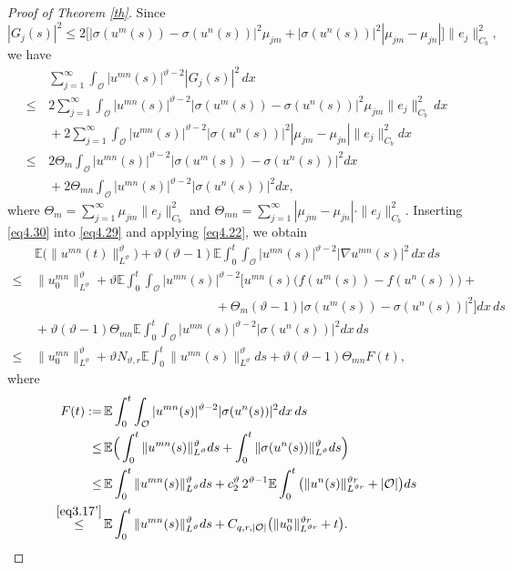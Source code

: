 \documentclass[10pt]{article}
\numberwithin{figure}{section}
\numberwithin{equation}{section}
\newcommand{\0}{{\theta}}
\def\.{\cdot}
\def\Hs{\hspace{1cm}}\def\hs{\hspace{0.5cm}}
\begin{document}
\begin{proof}[Proof of Theorem \ref{th}]
Since 
$$
|G_j(s)|^2\le 2\big[|\sigma(u^m(s))- \sigma(u^n(s))|^2\mu_{jm}+|\sigma(u^n(s))|^2|\mu_{jm}-\mu_{jn}|\big]\|e_j\|_{C_b}^2,
$$
we have
\begin{equation}\label{eq4.30}
\begin{split}
&\,\sum_{j=1}^\infty \int_{\mathcal{O}} |u^{mn}(s)|^{\vartheta-2} |G_j(s)|^2 \, dx \\
\le&\,2\sum_{j=1}^\infty  \int_{\mathcal{O}} |u^{mn}(s)|^{\vartheta-2} |\sigma(u^m(s))- \sigma(u^n(s))|^2\mu_{jm}\|e_j\|_{C_b}^2 \, dx\\
&\,+2\sum_{j=1}^\infty  \int_{\mathcal{O}} |u^{mn}(s)|^{\vartheta-2} |\sigma(u^n(s))|^2|\mu_{jm}-\mu_{jn}|\|e_j\|_{C_b}^2  dx\\
\le&\,2\Theta_m  \int_{\mathcal{O}} |u^{mn}(s)|^{\vartheta-2} |\sigma(u^m(s))- \sigma(u^n(s))|^2dx  \\
&\,+2\Theta_{mn}\int_{\mathcal{O}} |u^{mn}(s)|^{\vartheta-2} |\sigma(u^n(s))|^2 dx,
\end{split}
\end{equation}
where $\Theta_m=\sum_{j=1}^\infty\mu_{jm}\|e_j\|_{C_b}^2$ and $\Theta_{mn}=\sum_{j=1}^\infty|\mu_{jm}-\mu_{jn}|\.\|e_j\|_{C_b}^2$.
\vs
Inserting \eqref{eq4.30} into \eqref{eq4.29} and applying \eqref{eq4.22}, we obtain
\begin{equation}\label{eq4.31}
\begin{split}
&\,\mathbb{E}\big(\|u^{mn}(t)\|_{L^\vartheta}^\vartheta\big) +\vartheta(\vartheta-1) \mathbb{E}\int_0^t \int_{\mathcal{O}} |u^{mn}(s)|^{\vartheta-2} |\nabla u^{mn}(s)|^2 \, dx \, ds\\
\le &\,\|u^{mn}_0\|_{L^\vartheta}^\vartheta
+ \vartheta \mathbb{E}\int_0^t \int_{\mathcal{O}} |u^{mn}(s)|^{\vartheta-2}
        \big[  u^{mn}(s) \big( f(u^m(s)) - f(u^n(s)) \big)+ \\
&\Hs\Hs\Hs\Hs\Hs\Hs + \Theta_m (\vartheta-1) | \sigma(u^m(s)) - \sigma(u^n(s)) |^2 \big] dx \, ds \\
&\, + \vartheta(\vartheta-1)\Theta_{mn} \mathbb{E}\int_0^t\int_{\mathcal{O}} |u^{mn}(s)|^{\vartheta-2} |\sigma(u^n(s))|^2 dx\, ds\\
\le&\,\|u^{mn}_0\|_{L^\vartheta}^\vartheta
+ \vartheta N_{\vartheta,r}\mathbb{E}\int_0^t \|u^{mn}(s)\|_{L^\vartheta}^{\vartheta}ds +\vartheta(\vartheta-1)\Theta_{mn} F(t),
\end{split}
\end{equation}
where 
\begin{align*}
F(t):=&\,\mathbb{E}\int_0^t\int_{\mathcal{O}} |u^{mn}(s)|^{\vartheta-2} |\sigma(u^n(s))|^2 dx\, ds\\
\le&\,\mathbb{E}\Big(\int_0^t\|u^{mn}(s)\|_{L^\vartheta}^\vartheta ds+\int_0^t\|\sigma(u^n(s))\|_{L^\vartheta}^\vartheta ds\Big)\\
\le&\,\mathbb{E}\int_0^t\|u^{mn}(s)\|_{L^\vartheta}^\vartheta ds+c_2^\vartheta \, 2^{\vartheta-1} \mathbb{E}\int_0^t \big( \|u^n(s)\|_{L^{\vartheta r}}^{\vartheta r} + |\mathcal{O}| \big)ds\\
\stackrel{\eqref{eq3.17'}}{\le}&\,\mathbb{E}\int_0^t\|u^{mn}(s)\|_{L^\vartheta}^\vartheta ds + C_{q,r,|\mathcal{O}|}\big( \|u_0^n\|_{L^{\vartheta r}}^{\vartheta r} +t\big).
\end{align*}



\end{proof}
\end{document}
